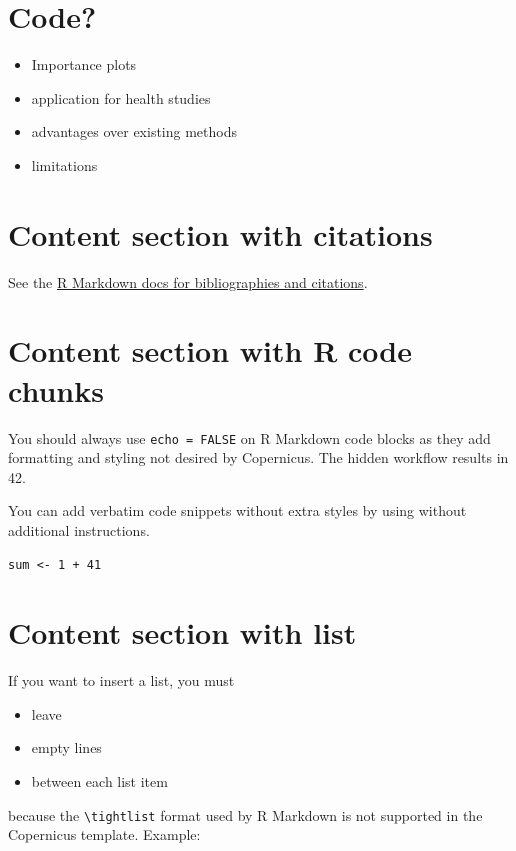 \documentclass[gmd, manuscript]{copernicus}
\providecommand{\tightlist}{%
  \setlength{\itemsep}{0pt}\setlength{\parskip}{0pt}}
\begin{document}
\section{Code?}

\begin{itemize}
\tightlist
\item
  Importance plots
\item
  application for health studies
\item
  advantages over existing methods
\item
  limitations
\end{itemize}

\section{Content section with citations}

See the
\href{http://rmarkdown.rstudio.com/authoring_bibliographies_and_citations.html}{R
Markdown docs for bibliographies and citations}.

\section{Content section with R code chunks}

You should always use \texttt{echo\ =\ FALSE} on R Markdown code blocks
as they add formatting and styling not desired by Copernicus. The hidden
workflow results in 42.

You can add verbatim code snippets without extra styles by using
\texttt{\textasciigrave{}\textasciigrave{}\textasciigrave{}} without
additional instructions.

\begin{verbatim}
sum <- 1 + 41
\end{verbatim}

\section{Content section with list}

If you want to insert a list, you must

\begin{itemize}
\item
  leave
\item
  empty lines
\item
  between each list item
\end{itemize}

because the \texttt{\textbackslash{}tightlist} format used by R Markdown
is not supported in the Copernicus template. Example:
\end{document}

